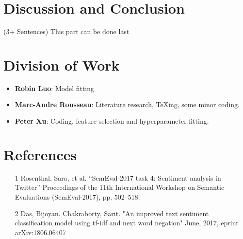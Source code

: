 \documentclass{amsart}
\theoremstyle{definition}
\theoremstyle{remark}
\numberwithin{equation}{section}
\begin{document}
\section{Discussion and Conclusion}(3+ Sentences)
This part can be done last
\section{Division of Work}
\begin{itemize}
\item{\textbf{Robin Luo}}: Model fitting 
\item{\textbf{Marc-Andre Rousseau}}: Literature research, TeXing, some minor coding.
\item{\textbf{Peter Xu}}: Coding, feature selection and hyperparameter fitting.
\end{itemize}
\section{References}
\begin{itemize}
	\item [1] Rosenthal, Sara, et al. “SemEval-2017 task 4: Sentiment analysis in Twitter” Proceedings of the 11th International Workshop on Semantic Evaluations (SemEval-2017), pp. 502–518.
	\item [2] Das, Bijoyan. Chakraborty, Sarit. "An improved text sentiment classification model using tf-idf and next word negation" June, 2017, eprint arXiv:1806.06407
\end{itemize}
\end{document}
